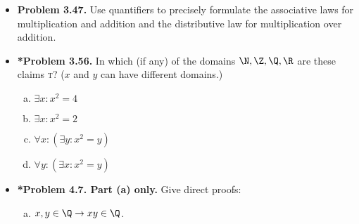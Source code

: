 \documentclass[11pt]{article}
\def\imp{\rightarrow}
\begin{document}
\begin{itemize}
\vspace{0.1in}

\item \textbf{Problem 3.47.}
  Use quantifiers to precisely formulate the associative laws
  for multiplication and addition and the distributive law
  for multiplication over addition.

\vspace{0.1in}

\item \textbf{*Problem 3.56.}
  In which (if any) of the domains $\N,\Z,\Q,\R$ are these claims \textsc{t}?
  ($x$ and $y$ can have different domains.)
  \begin{enumerate}[(a)]
  \item $\exists x:x^2=4$
  \item $\exists x:x^2=2$
  \item $\forall x: (\exists y:x^2=y)$
  \item $\forall y: (\exists x:x^2=y)$
  \end{enumerate}

\vspace{0.1in}

\item \textbf{*Problem 4.7. Part (a) only.}
  Give direct proofs:
  \begin{enumerate}[(a)]
  \item $x,y\in\Q\imp xy\in\Q$.
  \end{enumerate}

\end{itemize}
\end{document}
